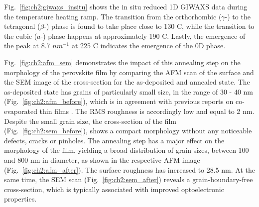 Fig.~\ref{fig:ch2:giwaxs_insitu} shows the in situ reduced 1D GIWAXS data during the temperature heating ramp. The transition from the orthorhombic ($\gamma$-) to the tetragonal ($\beta$-) phase is found to take place close to 130 \degree C, while the transition to the cubic ($a$-) phase happens at approximately 190 \degree C. Lastly, the emergence of the peak at 8.7 $nm^{-1}$ at 225 \degree C indicates the emergence of the 0D  phase. 


Fig.~\ref{fig:ch2:afm_sem} demonstrates the impact of this annealing step on the morphology of the perovskite film by comparing the AFM scan of the surface and the SEM image of the cross-section for the as-deposited and annealed state. The as-deposited state has grains of particularly small size, in the range of 30 - 40 nm (Fig.~\ref{fig:ch2:afm_before}), which is in agreement with previous reports on co-evaporated  thin films \cite{Frolova2017HighlyPbIsub2/sub, Zhang2023SemitransparentAbsorber}. The RMS roughness is accordingly low and equal to 2 nm. Despite the small grain size, the cross-section of the film (Fig.~\ref{fig:ch2:sem_before}), shows a compact morphology without any noticeable defects, cracks or pinholes. The annealing step has a major effect on the morphology of the film, yielding a broad distribution of grain sizes, between 100 and 800 nm in diameter, as shown in the respective AFM image (Fig.~\ref{fig:ch2:afm_after}). The surface roughness has increased to 28.5 nm. At the same time, the SEM scan (Fig.~\ref{fig:ch2:sem_after}) reveals a grain-boundary-free cross-section, which is typically associated with improved optoelectronic properties. 

